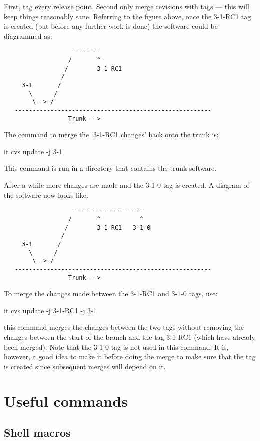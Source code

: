 \documentclass{dods-paper}
\begin{document}
First, tag every release point. Second only merge revisions with tags --- this
will keep things reasonably sane. Referring to the figure above, once the
3-1-RC1 tag is created (but before any further work is done) the software
could be diagrammed as:


\begin{verbatim}
                   --------
                  /       ^
                 /        3-1-RC1
                /
     3-1       /
       \      /
        \--> /
   -------------------------------------------------------
                  Trunk -->
\end{verbatim}

The command to merge the `3-1-RC1 changes' back onto the trunk is:

\begin{vcode}{it}
cvs update -j 3-1
\end{vcode}

This command is run in a directory that contains the trunk software.

After a while more changes are made and the 3-1-0 tag is created. A diagram
of the software now looks like:


\begin{verbatim}
                   --------------------
                  /       ^           ^
                 /        3-1-RC1   3-1-0
                /
     3-1       /
       \      /
        \--> /
   -------------------------------------------------------
                  Trunk -->
\end{verbatim}

To merge the changes made between the 3-1-RC1 and 3-1-0 tags, use:

\begin{vcode}{it}
cvs update -j 3-1-RC1 -j 3-1
\end{vcode}

this command merges the changes between the two tags without removing the
changes between the start of the branch and the tag 3-1-RC1 (which have
already been merged). Note that the 3-1-0 tag is not used in this command. It
is, however, a good idea to make it before doing the merge to make sure that
the tag is created since subsequent merges will depend on it.

\section{Useful commands}

\subsection{Shell macros}
\end{document}
